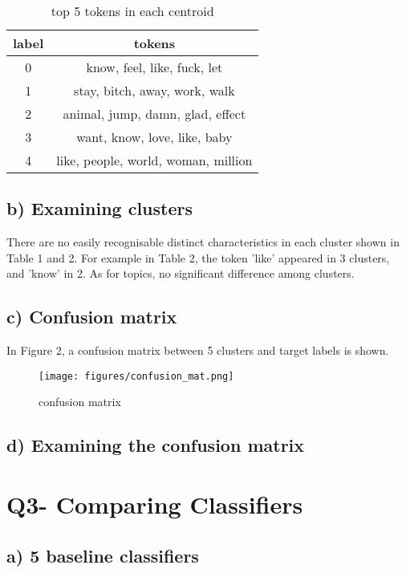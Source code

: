 \documentclass[a4paper,11pt]{article}
\begin{document}
\begin{table}[htb]

  \begin{center}
  \caption{top 5 tokens in each centroid}

  \begin{tabular}{|c|c|} 
    label & tokens\\ \hline \hline
    0 & know, feel, like, fuck, let \\ \hline
    1 & stay, bitch, away, work, walk\\ \hline
    2 & animal, jump, damn, glad, effect\\ \hline
    3 & want, know, love, like, baby\\ \hline
    4 & like, people, world, woman, million\\ \hline
  \end{tabular}
  \end{center}
\end{table}


\subsection{b) Examining clusters}
There are no easily recognisable distinct characteristics in each cluster shown in Table 1 and 2.
For example in Table 2, the token 'like' appeared in 3 clusters, and 'know' in 2.
As for topics, no significant difference among clusters.
\subsection{c) Confusion matrix}
In Figure 2, a confusion matrix between 5 clusters and target labels is shown.

\begin{figure}[htbp]
  \begin{center}
  \texttt{[image: figures/confusion\_mat.png]}
  \caption{confusion matrix}
  \end{center}
\end{figure}
\subsection{d) Examining the confusion matrix}



\section{Q3- Comparing Classifiers}
\subsection{a) 5 baseline classifiers}
\end{document}
